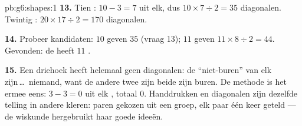 \begin{solution}{pb:g6:shapes:1}
\textbf{13.} Tien : $10 - 3 = 7$ uit elk, dus
$10 \times 7 \div 2 = 35$ diagonalen. Twintig :
$20 \times 17 \div 2 = 170$ diagonalen.

\textbf{14.} Probeer kandidaten: $10$  geven $35$ (vraag 13); $11$
 geven $11 \times 8 \div 2 = 44$. Gevonden: de  heeft $11$
.

\textbf{15.} Een driehoek heeft helemaal geen diagonalen: de
``niet-buren'' van elk  zijn\,\dots\ niemand, want de andere twee
 zijn beide zijn buren. De methode is het ermee eens: $3 - 3 = 0$ uit
elk , totaal $0$. Handdrukken en diagonalen zijn dezelfde telling in
andere kleren: paren gekozen uit een groep, elk paar één keer geteld --- de
wiskunde hergebruikt haar goede ideeën.
\end{solution}
